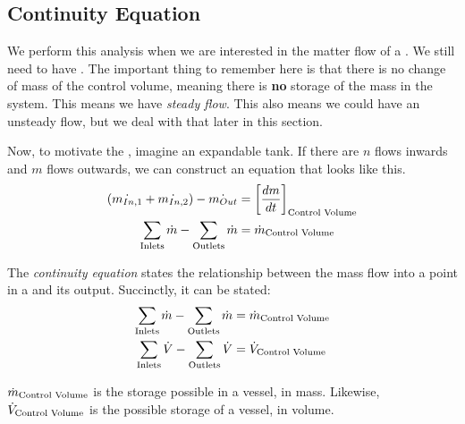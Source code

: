 \subsection{Continuity Equation}\label{subsec:Continuity_Equation}
We perform this analysis when we are interested in the matter flow of a .
We still need to have .
The important thing to remember here is that there is no change of mass of the control volume, meaning there is \textbf{no} storage of the mass in the system.
This means we have \emph{steady flow}.
This also means we could have an unsteady flow, but we deal with that later in this section.

Now, to motivate the , imagine an expandable tank.
If there are $n$ flows inwards and $m$ flows outwards, we can construct an equation that looks like this.
\begin{align*}
  (\dot{m_{In,1}} + \dot{m_{In,2}}) - \dot{m_{Out}} &= {\left[ \frac{dm}{dt} \right]}_{\text{Control Volume}} \\
  \sum\limits_{\text{Inlets}} \dot{m} - \sum\limits_{\text{Outlets}} \dot{m} &= \dot{m}_{\text{Control Volume}}
\end{align*}

\begin{definition}\label{def:Continuity_Equation}
  The \emph{continuity equation} states the relationship between the mass flow into a point in a  and its output.
  Succinctly, it can be stated:
  \begin{equation}\label{eq:Continuity_Equation}
    \begin{aligned}
      \sum\limits_{\text{Inlets}} \dot{m} - \sum\limits_{\text{Outlets}} \dot{m} &= \dot{m}_{\text{Control Volume}} \\
      \sum\limits_{\text{Inlets}} \dot{V} - \sum\limits_{\text{Outlets}} \dot{V} &= \dot{V}_{\text{Control Volume}}
    \end{aligned}
  \end{equation}

  \begin{description}[noitemsep]
  \item $\dot{m}_{\text{Control Volume}}$ is the storage possible in a vessel, in mass.
    Likewise, $\dot{V}_{\text{Control Volume}}$ is the possible storage of a vessel, in volume.
  \end{description}

\end{definition}

